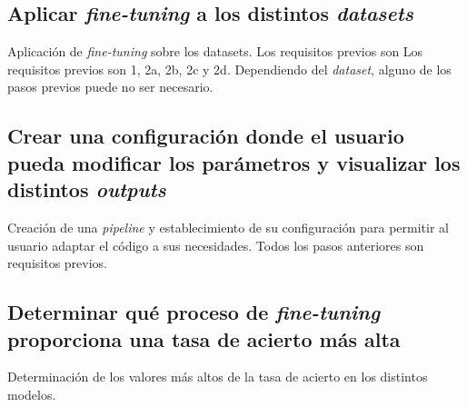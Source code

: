 \subsection{Aplicar \textit{fine-tuning} a los distintos \textit{datasets}}

Aplicación de \textit{fine-tuning} sobre los datasets. Los requisitos previos son  Los requisitos previos son 1, 2a, 2b, 2c y 2d. Dependiendo del \textit{dataset}, alguno de los pasos previos puede no ser necesario.

\subsection{Crear una configuración donde el usuario pueda modificar los parámetros y visualizar los distintos \textit{outputs}}

Creación de una \textit{pipeline} y establecimiento de su configuración para permitir al usuario adaptar el código a sus necesidades. Todos los pasos anteriores son requisitos previos.

\subsection{Determinar qué proceso de \textit{fine-tuning} proporciona una tasa de acierto más alta}

Determinación de los valores más altos de la tasa de acierto en los distintos modelos.



